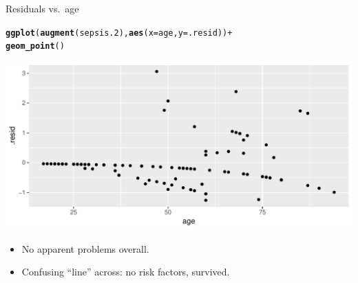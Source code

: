 \documentclass[unknownkeysallowed]{beamer}\usepackage[]{graphicx}\usepackage[]{color}
\makeatletter
\def\maxwidth{ %
  \ifdim\Gin@nat@width>\linewidth
    \linewidth
  \else
    \Gin@nat@width
  \fi
}
\newcommand{\hlopt}[1]{\textcolor[rgb]{0,0,0}{#1}}%
\newcommand{\hlstd}[1]{\textcolor[rgb]{0.345,0.345,0.345}{#1}}%
\newcommand{\hlkwc}[1]{\textcolor[rgb]{0.333,0.667,0.333}{#1}}%
\newcommand{\hlkwd}[1]{\textcolor[rgb]{0.737,0.353,0.396}{\textbf{#1}}}%
\newenvironment{kframe}{%
 \def\at@end@of@kframe{}%
 \ifinner\ifhmode%
  \def\at@end@of@kframe{\end{minipage}}%
  \begin{minipage}{\columnwidth}%
 \fi\fi%
 \def\FrameCommand##1{\hskip\@totalleftmargin \hskip-\fboxsep
 \colorbox{shadecolor}{##1}\hskip-\fboxsep
     \hskip-\linewidth \hskip-\@totalleftmargin \hskip\columnwidth}%
 \MakeFramed {\advance\hsize-\width
   \@totalleftmargin\z@ \linewidth\hsize
   \@setminipage}}%
 {\par\unskip\endMakeFramed%
 \at@end@of@kframe}
\newenvironment{knitrout}{}{} %
\makeatother
\begin{document}
\begin{frame}[fragile]{Residuals vs.\ age}

 
\begin{knitrout}
\color{fgcolor}\begin{kframe}
\begin{alltt}
\hlkwd{ggplot}\hlstd{(}\hlkwd{augment}\hlstd{(sepsis.2),}\hlkwd{aes}\hlstd{(}\hlkwc{x}\hlstd{=age,}\hlkwc{y}\hlstd{=.resid))}\hlopt{+}
  \hlkwd{geom_point}\hlstd{()}
\end{alltt}
\end{kframe}
\includegraphics[width=\maxwidth]{figure/virtusentella-1} 

\end{knitrout}
  
  
\begin{itemize}
\item No apparent problems overall.
\item Confusing ``line'' across: no risk factors, survived. 
\end{itemize}
  
\end{frame}
\end{document}
